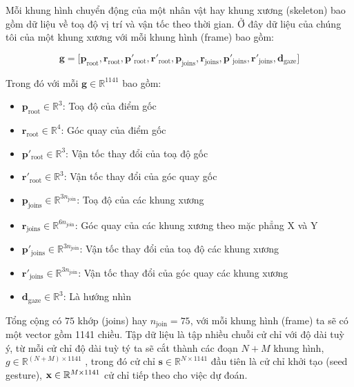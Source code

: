 Mỗi khung hình chuyển động của một nhân vật hay khung xương (skeleton) bao gồm dữ liệu về toạ độ vị trí và vận tốc theo thời gian.
Ở đây dữ liệu của chúng tôi của một khung xương với mỗi khung hình (frame) bao gồm:

\begin{equation} \label{eq:gesturevector}
\mathbf{g} = \Big[ \mathbf{p}_{\text{root}},  \mathbf{r}_{\text{root}},
\mathbf{ p }'_{\text{root}},  \mathbf{r}'_{\text{root}},
\mathbf{p}_{\text{joins}},  \mathbf{r}_{\text{joins}},
\mathbf{p}'_{\text{joins}},  \mathbf{r}'_{\text{joins}},
\mathbf{d}_{\text{gaze}}
\Big]
\end{equation}



Trong  đó với mỗi $\mathbf{g} \in \mathbb{R}^{1141}$ bao gồm:
{
\begin{itemize}
	\item $\mathbf{p}_{\text{root}} \in \mathbb{R}^3$: Toạ độ của điểm gốc
	\item $\mathbf{r}_{\text{root}} \in \mathbb{R}^4$: Góc quay của điểm gốc
	\item $\mathbf{p}'_{\text{root}} \in \mathbb{R}^3$: Vận tốc thay đổi của toạ độ gốc
	\item $\mathbf{r}'_{\text{root}} \in \mathbb{R}^3$: Vận tốc thay đổi của góc quay gốc
	
	\item $\mathbf{p}_{\text{joins}} \in \mathbb{R}^{3 n_{\text{join} }}$: Toạ độ của các khung xương
	\item $\mathbf{r}_{\text{joins}} \in \mathbb{R}^{6 n_{\text{join} }}$: Góc quay của các khung xương theo mặc phẳng X và Y
	\item $\mathbf{p}'_{\text{joins}} \in \mathbb{R}^{3n_{\text{join} }}$: Vận tốc thay đổi của toạ độ các khung xương
	\item $\mathbf{r}'_{\text{joins}} \in \mathbb{R}^{3n_{\text{join} }}$: Vận tốc thay đổi của góc quay các khung xương
	\item $\mathbf{d}_{\text{gaze}} \in \mathbb{R}^3$: Là hướng nhìn
\end{itemize}}




Tổng cộng có $75$ khớp (joins) hay $n_{\text{join}} = 75$, với mỗi khung hình (frame) ta sẽ có một vector gồm 1141 chiều.
Tập dữ liệu là tập nhiều chuỗi cử chỉ với độ dài tuỳ ý, từ mỗi cử chỉ độ dài tuỳ tý ta sẽ cắt thành các đoạn $N + M$ khung hình, $g \in \mathbb{R}^{(N + M) \times 1141}$ , trong đó cử chỉ $\mathbf{s} \in \mathbb{R}^{N \times 1141}$ đầu tiên là cử chỉ khởi tạo (seed gesture), $\mathbf{x} \in \mathbb{R}^{M \times 1141}$ cử chỉ tiếp theo cho việc dự đoán.


